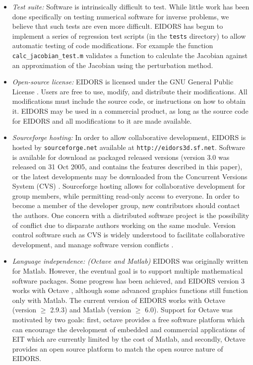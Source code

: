 \documentclass[12pt]{iopart}
\begin{document}
\begin{itemize}
  \item {\em Test suite:}
Software is intrinsically difficult to test. While little work
has been done specifically on testing numerical software
for inverse problems, we
believe that such tests are even more difficult.
EIDORS has begun to implement a series of regression test
scripts (in the {\tt tests} directory)
to allow automatic testing of code modifications.
For example the function {\tt calc\_jacobian\_test.m}
validates a function to calculate the Jacobian against
an approximation of the Jacobian using the perturbation method. 

  \item {\em Open-source license:}
EIDORS is licensed under the
GNU General Public License \cite{Free_Software_Foundation_1991}.
Users are free to use, modify, and
distribute their modifications. All modifications must include the
source code, or instructions on how to obtain it. EIDORS may be used
in a commercial product, as long as the source code for EIDORS and all
modifications to it are made available.

  \item {\em Sourceforge hosting:}
In order to allow collaborative development, 
EIDORS is hosted by {\tt sourceforge.net}
available at {\tt http://eidors3d.sf.net}.
Software is available for download as packaged released versions
(version 3.0 was released on 31 Oct 2005, and
contains the features described in this paper),
or the latest developments may be downloaded from the
Concurrent Versions System (CVS) \cite{Cederqvist_2002}.
Sourceforge hosting allows for collaborative development for
group members, while permitting read-only access to everyone.
In order to become a member of the developer group, new
contributors should contact the authors.
One concern with a distributed software project is
the possibility of conflict due to disparate authors
working on the same module.
Version control software such as CVS is widely understood
to facilitate collaborative development, and manage
software version conflicts \cite{Cederqvist_2002}.


  \item {\em Language independence: (Octave and Matlab)}
EIDORS was originally written for Matlab.
However, the eventual goal is to support multiple
mathematical software packages.
Some progress has been achieved, and EIDORS version 3
works with Octave \cite{Eaton_2002}, although some 
advanced graphics functions still function only with Matlab.
The current version of EIDORS works with Octave
(version $\ge$ 2.9.3)
and Matlab (version $\ge$ 6.0).
Support for Octave was motivated by two goals:
first, octave provides a free software platform
which can encourage the development of embedded
and commercial applications of EIT which are
currently
limited by the cost of Matlab, and secondly,
Octave provides an open source platform to match
the open source nature of EIDORS.


\end{itemize}
\end{document}
